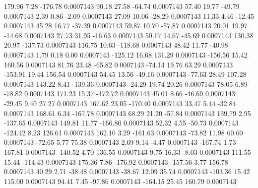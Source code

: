      179.96        7.28     -176.78     0.0007143
       90.18       27.58      -64.74     0.0007143
       57.40       19.77      -49.79     0.0007143
        2.39        0.86       -2.09     0.0007143
       27.09       10.06      -28.29     0.0007143
       11.33        4.46      -12.45     0.0007143
       45.28       16.77      -37.39     0.0007143
       59.87       10.70      -57.87     0.0007143
       20.01       19.97      -14.68     0.0007143
       27.73       31.95      -16.63     0.0007143
       50.17       14.67      -45.69     0.0007143
      130.38       20.97     -137.73     0.0007143
      116.75       10.63     -118.68     0.0007143
       48.42       11.77      -40.98     0.0007143
        1.79        0.18        0.00     0.0007143
     -125.12       16.68      131.29     0.0007143
     -156.56       15.42      160.56     0.0007143
       81.76       23.48      -65.82     0.0007143
      -74.14       19.76       63.29     0.0007143
     -153.91       19.44      156.54     0.0007143
       54.45       13.56      -49.16     0.0007143
      -77.63       28.49      107.28     0.0007143
      143.22        8.41     -139.36     0.0007143
      -24.29       19.74       20.26     0.0007143
       78.05        6.89      -78.82     0.0007143
      171.23       15.37     -172.72     0.0007143
       45.01        8.66      -46.69     0.0007143
      -29.45        9.40       27.27     0.0007143
      167.62       23.05     -170.40     0.0007143
       33.47        5.44      -32.84     0.0007143
      168.61        6.34     -167.78     0.0007143
       68.29       21.20      -57.84     0.0007143
      139.79        2.95     -137.65     0.0007143
      149.81       11.77     -166.80     0.0007143
       52.32        4.55      -50.73     0.0007143
     -124.42        8.23      126.61     0.0007143
      162.10        3.29     -161.63     0.0007143
      -73.82       11.98       60.60     0.0007143
      -72.65        5.77       75.38     0.0007143
        2.69        9.14       -4.47     0.0007143
     -167.74        1.73      167.81     0.0007143
     -140.52        4.70      136.55     0.0007143
        9.75       16.33       -8.03     0.0007143
      111.55       15.44     -114.43     0.0007143
      175.36        7.86     -176.92     0.0007143
     -157.56        3.77      156.78     0.0007143
       40.29        2.71      -38.48     0.0007143
      -38.67       12.09       35.74     0.0007143
     -103.36       15.42      115.00     0.0007143
       94.41        7.45      -97.86     0.0007143
     -164.15       25.45      160.79     0.0007143

